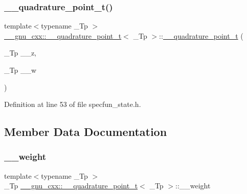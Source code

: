 \subsubsection{\texorpdfstring{\+\_\+\+\_\+quadrature\+\_\+point\+\_\+t()}{\_\_quadrature\_point\_t()}\hspace{0.1cm}{\footnotesize\ttfamily [2/2]}}
{\footnotesize\ttfamily template$<$typename \+\_\+\+Tp $>$ \\
\hyperlink{struct____gnu__cxx_1_1____quadrature__point__t}{\+\_\+\+\_\+gnu\+\_\+cxx\+::\+\_\+\+\_\+quadrature\+\_\+point\+\_\+t}$<$ \+\_\+\+Tp $>$\+::\hyperlink{struct____gnu__cxx_1_1____quadrature__point__t}{\+\_\+\+\_\+quadrature\+\_\+point\+\_\+t} (\begin{DoxyParamCaption}\item[{\+\_\+\+Tp}]{\+\_\+\+\_\+z,  }\item[{\+\_\+\+Tp}]{\+\_\+\+\_\+w }\end{DoxyParamCaption})\hspace{0.3cm}{\ttfamily [inline]}}



Definition at line 53 of file specfun\+\_\+state.\+h.



\subsection{Member Data Documentation}
\mbox{\label{struct____gnu__cxx_1_1____quadrature__point__t_a231e04e186e8e45b431876cc958a81c2}} 
\subsubsection{\texorpdfstring{\+\_\+\+\_\+weight}{\_\_weight}}
{\footnotesize\ttfamily template$<$typename \+\_\+\+Tp $>$ \\
\+\_\+\+Tp \hyperlink{struct____gnu__cxx_1_1____quadrature__point__t}{\+\_\+\+\_\+gnu\+\_\+cxx\+::\+\_\+\+\_\+quadrature\+\_\+point\+\_\+t}$<$ \+\_\+\+Tp $>$\+::\+\_\+\+\_\+weight}



